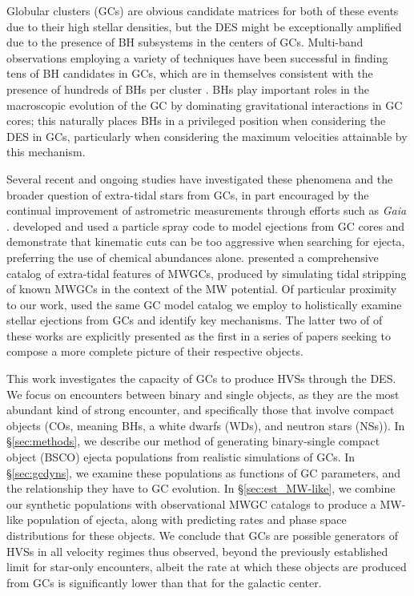 \documentclass[twocolumn]{aastex631}
\begin{document}
Globular clusters (GCs) are obvious candidate matrices for both of these events due to their high stellar densities, but the DES might be exceptionally amplified due to the presence of BH subsystems in the centers of GCs.
Multi-band observations \citep{Maccarone2007a, Barnard2011, Chomiuk2013, Miller-Jones2015a} employing a variety of techniques \citep{Strader2012, Bahramian2016, Giesers2018} have been successful in finding tens of BH candidates in GCs, which are in themselves consistent with the presence of hundreds of BHs per cluster \citep{2018ApJ...855L..15K, Giesers2019}.
BHs play important roles in the macroscopic evolution of the GC \citep[e.g.][]{2020IAUS..351..357K} by dominating gravitational interactions in GC cores; this naturally places BHs in a privileged position when considering the DES in GCs, particularly when considering the maximum velocities attainable by this mechanism.

Several recent and ongoing studies have investigated these phenomena and the broader question of extra-tidal stars from GCs, in part encouraged by the continual improvement of astrometric measurements through efforts such as \textit{Gaia} \citep{2022arXiv220800211G}.
\citet{2023MNRAS.518.4249G} developed and used a particle spray code to model ejections from GC cores and demonstrate that kinematic cuts can be too aggressive when searching for ejecta, preferring the use of chemical abundances alone.
\citet{2023arXiv230105166F} presented a comprehensive catalog of extra-tidal features of MWGCs, produced by simulating tidal stripping of known MWGCs in the context of the MW potential.
Of particular proximity to our work, \citet{2022arXiv221116523W} used the same GC model catalog we employ to holistically examine stellar ejections from GCs and identify key mechanisms.
The latter two of of these works are explicitly presented as the first in a series of papers seeking to compose a more complete picture of their respective objects.

This work investigates the capacity of GCs to produce HVSs through the DES.
We focus on encounters between binary and single objects, as they are the most abundant kind of strong encounter, and specifically those that involve compact objects (COs, meaning BHs, a white dwarfs (WDs), and neutron stars (NSs)).
In \S\ref{sec:methods}, we describe our method of generating binary-single compact object (BSCO) ejecta populations from realistic simulations of GCs.
In \S\ref{sec:gcdyns}, we examine these populations as functions of GC parameters, and the relationship they have to GC evolution.
In \S\ref{sec:est_MW-like}, we combine our synthetic populations with observational MWGC catalogs to produce a MW-like population of ejecta, along with predicting rates and phase space distributions for these objects.
We conclude that GCs are possible generators of HVSs in all velocity regimes thus observed, beyond the previously established limit for star-only encounters, albeit the rate at which these objects are produced from GCs is significantly lower than that for the galactic center.
\end{document}
